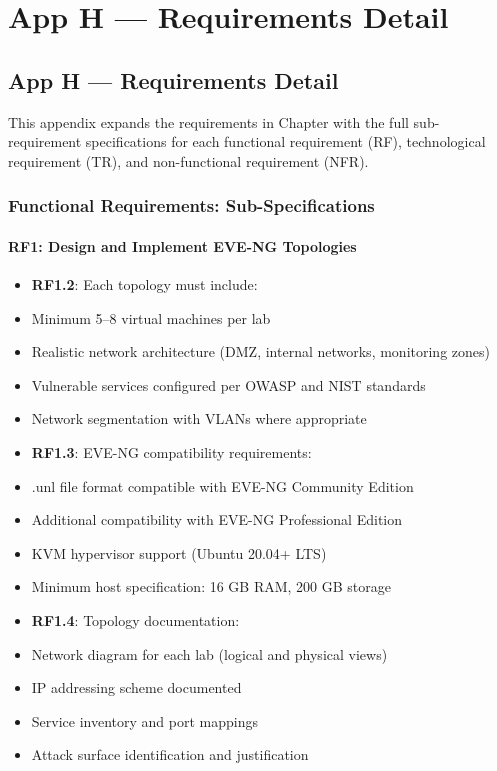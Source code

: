 \chapter{App H --- Requirements Detail}

\section{App H --- Requirements Detail}

This appendix expands the requirements in Chapter with the full sub-requirement specifications for each functional requirement (RF), technological requirement (TR), and non-functional requirement (NFR).

\subsection{Functional Requirements: Sub-Specifications}

\subsubsection{RF1: Design and Implement EVE-NG Topologies}

\begin{itemize}
\tightlist
\item
  \textbf{RF1.2}: Each topology must include:
\item
  Minimum 5--8 virtual machines per lab
\item
  Realistic network architecture (DMZ, internal networks, monitoring zones)
\item
  Vulnerable services configured per OWASP and NIST standards
\item
  Network segmentation with VLANs where appropriate
\item
  \textbf{RF1.3}: EVE-NG compatibility requirements:
\item
  .unl file format compatible with EVE-NG Community Edition
\item
  Additional compatibility with EVE-NG Professional Edition
\item
  KVM hypervisor support (Ubuntu 20.04+ LTS)
\item
  Minimum host specification: 16 GB RAM, 200 GB storage
\item
  \textbf{RF1.4}: Topology documentation:
\item
  Network diagram for each lab (logical and physical views)
\item
  IP addressing scheme documented
\item
  Service inventory and port mappings
\item
  Attack surface identification and justification
\end{itemize}

